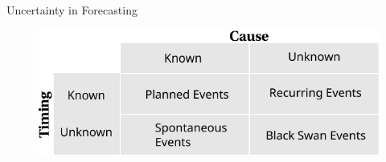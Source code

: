    \begin{frame}{Uncertainty in Forecasting}
       
    \begin{figure}
        \centering
        \includegraphics[width=\textwidth]{Problem1/figures/event_confusionMatrix.pdf}
    \end{figure}
    \end{frame}
